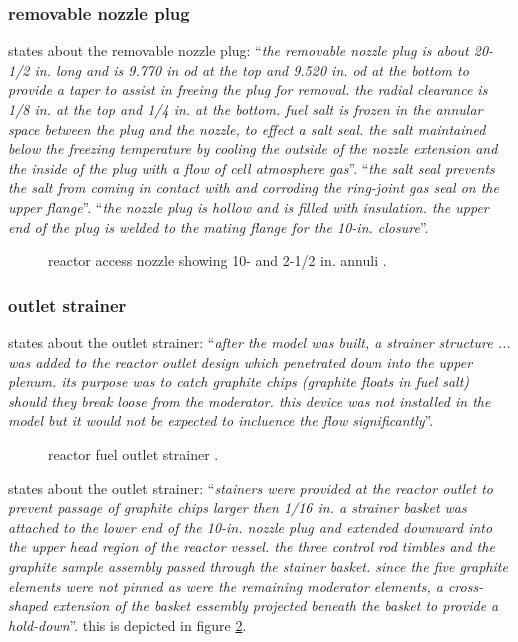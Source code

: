 \documentclass{article}
\begin{document}
\begin{preview}
\subsubsection{removable nozzle plug}
\parencite[page 104-105]{ornl-tm-0728} states about the removable nozzle plug: \enquote{\textit{the removable nozzle plug is about 20-1/2 in. long and is 9.770 in od at the top and 9.520 in. od at the bottom to provide a taper to assist in freeing the plug for removal. the radial clearance is 1/8 in. at the top and 1/4 in. at the bottom. fuel salt is frozen in the annular space between the plug and the nozzle, to effect a salt seal. the salt maintained below the freezing temperature by cooling the outside of the nozzle extension and the inside of the plug with a flow of cell atmosphere gas}}. \enquote{\textit{the salt seal prevents the salt from coming in contact with and corroding the ring-joint gas seal on the upper flange}}. \enquote{\textit{the nozzle plug is hollow and is filled with insulation. the upper end of the plug is welded to the mating flange for the 10-in. closure}}.


\begin{figure}[H]
  \centering
  \centering
  \caption{reactor access nozzle showing 10- and 2-1/2 in. annuli  \parencite[figure 5.10]{ornl-tm-3229}.}
  \label{3039-fig5-10}
\end{figure}

\subsubsection{outlet strainer}
\textcite[page 24-26]{ornl-tm-3229} states about the outlet strainer: \enquote{\textit{after the model was built, a strainer structure ... was added to the reactor outlet design which penetrated down into the upper plenum. its purpose was to catch graphite chips (graphite floats in fuel salt) should they break loose from the moderator. this device was not installed in the model but it would not be expected to incluence the flow significantly}}.

\begin{figure}[H]
  \centering
  \centering
  \caption{reactor fuel outlet strainer \parencite[figure 5.11]{ornl-tm-3229}.}
  \label{3039-fig5-11}
\end{figure}

\textcite[page 115]{ornl-tm-3039} states about the outlet strainer: \enquote{\textit{stainers were provided at the reactor outlet to prevent passage of graphite chips larger then 1/16 in. a strainer basket was attached to the lower end of the 10-in. nozzle plug and extended downward into the upper head region of the reactor vessel. the three control rod timbles and the graphite sample assembly passed through the stainer basket. since the five graphite elements were not pinned as were the remaining moderator elements, a cross-shaped extension of the basket essembly projected beneath the basket to provide a hold-down}}. this is depicted in figure \ref{3039-fig5-11}.



\end{preview}
\end{document}
